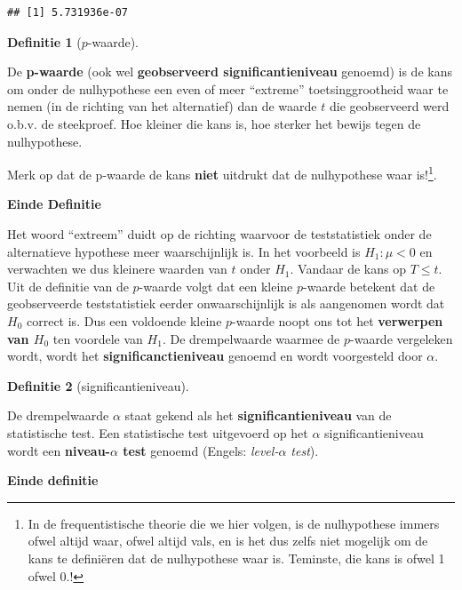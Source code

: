 \documentclass[
  12pt,dutch,coursenotes]{book}
\theoremstyle{definition}
\newtheorem{definition}{Definitie}[chapter]
\theoremstyle{definition}
\theoremstyle{definition}
\theoremstyle{definition}
\theoremstyle{remark}
\begin{document}
\begin{lstlisting}
## [1] 5.731936e-07
\end{lstlisting}

\begin{definition}[$p$-waarde]
\protect\hypertarget{def:unnamed-chunk-163}{}{\label{def:unnamed-chunk-163} {} }
\end{definition}
De \textbf{p-waarde} (ook wel \textbf{geobserveerd significantieniveau} genoemd) is de
kans om onder de nulhypothese een even of meer ``extreme'' toetsinggrootheid
waar te nemen (in de richting van het alternatief) dan de waarde \(t\) die
geobserveerd werd o.b.v. de steekproef. Hoe kleiner die kans is, hoe sterker het bewijs tegen de
nulhypothese.

Merk op dat de p-waarde de kans \textbf{niet} uitdrukt dat de nulhypothese waar is!\footnote{In de frequentistische theorie die we hier volgen, is de nulhypothese immers ofwel altijd waar, ofwel altijd vals, en is het dus zelfs niet mogelijk om de kans te definiëren dat de nulhypothese waar is. Teminste, die kans is ofwel 1 ofwel 0.!}.

\textbf{Einde Definitie}

Het woord ``extreem'' duidt op de richting waarvoor de teststatistiek onder de alternatieve hypothese meer waarschijnlijk is. In het voorbeeld is \(H_1: \mu < 0\) en verwachten we dus kleinere waarden van \(t\) onder \(H_1\). Vandaar de kans op \(T\leq t\).
Uit de definitie van de \(p\)-waarde volgt dat een kleine \(p\)-waarde betekent dat de geobserveerde teststatistiek eerder onwaarschijnlijk is als aangenomen wordt dat \(H_0\) correct is.
Dus een voldoende kleine \(p\)-waarde noopt ons tot het \textbf{verwerpen van \(H_0\)} ten voordele van \(H_1\).
De drempelwaarde waarmee de \(p\)-waarde vergeleken wordt, wordt het \textbf{significanctieniveau} genoemd en wordt voorgesteld door \(\alpha\).

\begin{definition}[significantieniveau]
\protect\hypertarget{def:unnamed-chunk-164}{}{\label{def:unnamed-chunk-164} {} }
\end{definition}
De drempelwaarde \(\alpha\) staat gekend als het \textbf{significantieniveau} van de statistische test. Een statistische test uitgevoerd op het \(\alpha\) significantieniveau wordt een \textbf{niveau-\(\alpha\) test} genoemd (Engels: \emph{level-\(\alpha\) test}).

\textbf{Einde definitie}
\end{document}
